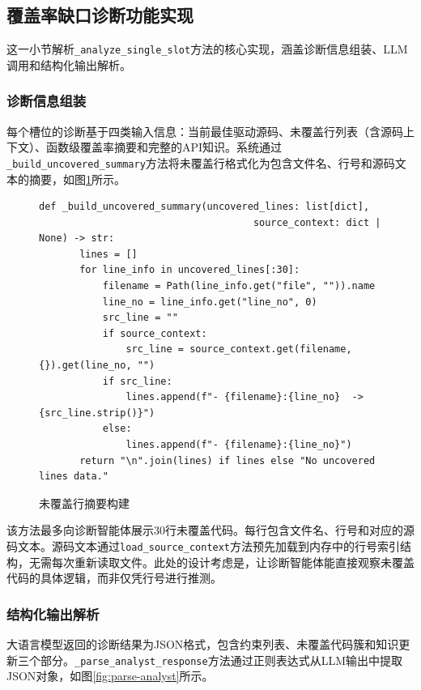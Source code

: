 \subsection{覆盖率缺口诊断功能实现}

这一小节解析\texttt{\_analyze\_single\_slot}方法的核心实现，涵盖诊断信息组装、LLM调用和结构化输出解析。

\subsubsection{诊断信息组装}

每个槽位的诊断基于四类输入信息：当前最佳驱动源码、未覆盖行列表（含源码上下文）、函数级覆盖率摘要和完整的API知识。系统通过\texttt{\_build\_uncovered\_summary}方法将未覆盖行格式化为包含文件名、行号和源码文本的摘要，如图\ref{fig:uncovered-summary}所示。

\begin{figure}[H]
    \centering
    \begin{lstlisting}[style=style@python]
   def _build_uncovered_summary(uncovered_lines: list[dict],
                                     source_context: dict | None) -> str:
       lines = []
       for line_info in uncovered_lines[:30]:
           filename = Path(line_info.get("file", "")).name
           line_no = line_info.get("line_no", 0)
           src_line = ""
           if source_context:
               src_line = source_context.get(filename, {}).get(line_no, "")
           if src_line:
               lines.append(f"- {filename}:{line_no}  ->  {src_line.strip()}")
           else:
               lines.append(f"- {filename}:{line_no}")
       return "\n".join(lines) if lines else "No uncovered lines data."
    \end{lstlisting}
    \caption{未覆盖行摘要构建}
    \label{fig:uncovered-summary}
\end{figure}

该方法最多向诊断智能体展示30行未覆盖代码。每行包含文件名、行号和对应的源码文本。源码文本通过\texttt{load\_source\_context}方法预先加载到内存中的行号索引结构，无需每次重新读取文件。此处的设计考虑是，让诊断智能体能直接观察未覆盖代码的具体逻辑，而非仅凭行号进行推测。

\subsubsection{结构化输出解析}

大语言模型返回的诊断结果为JSON格式，包含约束列表、未覆盖代码簇和知识更新三个部分。\texttt{\_parse\_analyst\_response}方法通过正则表达式从LLM输出中提取JSON对象，如图\ref{fig:parse-analyst}所示。

